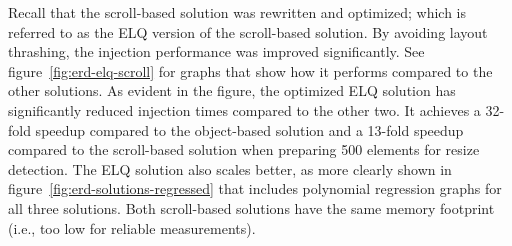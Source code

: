 \documentclass[a4paper,11pt]{kth-mag}
\begin{document}
        Recall that the scroll-based solution was rewritten and optimized; which is referred to as the \gls{ELQ} version of the scroll-based solution.
        By avoiding \gls{layout thrashing}, the injection performance was improved significantly.
        See figure~\ref{fig:erd-elq-scroll} for graphs that show how it performs compared to the other solutions.
        As evident in the figure, the optimized \gls{ELQ} solution has significantly reduced injection times compared to the other two.
        It achieves a 32-fold speedup compared to the object-based solution and a 13-fold speedup compared to the scroll-based solution when preparing 500 \glspl{element} for resize detection.
        The \gls{ELQ} solution also scales better, as more clearly shown in figure~\ref{fig:erd-solutions-regressed} that includes polynomial regression graphs for all three solutions.
        Both scroll-based solutions have the same memory footprint (i.e., too low for reliable measurements).
\end{document}
